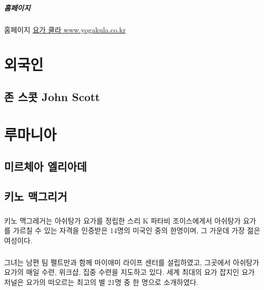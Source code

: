 \documentclass[12pt, a4paper, oneside]{book}
\let\stdsection\section
\renewcommand\section{\newpage\stdsection}
\begin{document}
\paragraph{홈페이지} 홈페이지	\href{http://www.yogakula.co.kr/}{요가 쿨라 www.yogakula.co.kr}





	\chapter{외국인}
	\minitoc

	\section{존 스콧 John Scott}





	\chapter{루마니아}
	\minitoc


	\section{미르체아 엘리아데}



%
	\section{키노 맥그리거}

\paragraph{}
키노 맥그레거는 아쉬탕가 요가를 정립한 스리 K 파타비 조이스에게서 아쉬탕가 요가를 가르칠 수 있는 자격을 인증받은 14명의 미국인 중의 한명이며, 그 가운데 가장 젊은 여성이다.

\paragraph{}
그녀는 남편 팀 펠트만과 함께 마이애미 라이프 센터를 설립하였고, 그곳에서 아쉬탕가 요가의 매일 수련, 위크샵, 집중 수련을 지도하고 있다.
세계 최대의 요가 잡지인 요가 저널은 요가의 떠오르는 최고의 별 21명 중 한 명으로 소개하였다.
\end{document}
